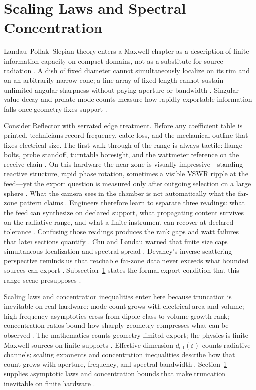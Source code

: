 \section{Scaling Laws and Spectral Concentration}
\label{sec:ch48}
Landau--Pollak--Slepian theory enters a Maxwell chapter as a description of finite information capacity on compact domains, not as a substitute for source radiation \cite{landau1962}. A dish of fixed diameter cannot simultaneously localize on its rim and on an arbitrarily narrow cone; a line array of fixed length cannot sustain unlimited angular sharpness without paying aperture or bandwidth \cite{harrington2001}. Singular-value decay and prolate mode counts measure how rapidly exportable information falls once geometry fixes support \cite{devaney2004}.
\begin{physicalvignette}
Consider Reflector with serrated edge treatment. Before any coefficient table is printed, technicians record frequency, cable loss, and the mechanical outline that fixes electrical size. The first walk-through of the range is always tactile: flange bolts, probe standoff, turntable boresight, and the wattmeter reference on the receive chain \cite{hansen1988}.
On this hardware the near zone is visually impressive---standing reactive structure, rapid phase rotation, sometimes a visible VSWR ripple at the feed---yet the export question is measured only after outgoing selection on a large sphere \cite{harrington2001}. What the camera sees in the chamber is not automatically what the far-zone pattern claims \cite{stratton1941}.
Engineers therefore learn to separate three readings: what the feed can synthesize on declared support, what propagating content survives on the radiative range, and what a finite instrument can recover at declared tolerance \cite{devaney2004}. Confusing those readings produces the rank gaps and watt failures that later sections quantify \cite{pal2026}.
Chu and Landau warned that finite size caps simultaneous localization and spectral spread \cite{chu1948}. Devaney's inverse-scattering perspective reminds us that reachable far-zone data never exceeds what bounded sources can export \cite{devaney2004}.
Subsection~\ref{sec:ch48} states the formal export condition that this range scene presupposes \cite{stratton1941}.
\end{physicalvignette}
Scaling laws and concentration inequalities enter here because truncation is inevitable on real hardware: mode count grows with electrical area and volume; high-frequency asymptotics cross from dipole-class to volume-growth rank; concentration ratios bound how sharply geometry compresses what can be observed \cite{stratton1941}. The mathematics counts geometry-limited export; the physics is finite Maxwell sources on finite supports \cite{chu1948}.
Effective dimension $d_{\mathrm{eff}}(\varepsilon)$ counts radiative channels; scaling exponents and concentration inequalities describe how that count grows with aperture, frequency, and spectral bandwidth \cite{stratton1941}. Section~\ref{sec:ch48} supplies asymptotic laws and concentration bounds that make truncation inevitable on finite hardware \cite{devaney2004}.

